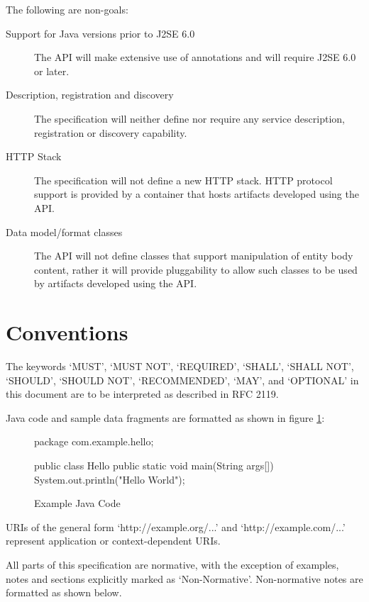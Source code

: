 The following are non-goals:

\begin{description}

\item[Support for Java versions prior to J2SE 6.0] The API will make extensive use of annotations and will require J2SE 6.0 or later.

\item[Description, registration and discovery] The specification will neither define nor require any service description, registration or discovery capability.

\item[HTTP Stack] The specification will not define a new HTTP stack. HTTP protocol support is provided by a container that hosts artifacts developed using the API.

\item[Data model/format classes] The API will not define classes that support manipulation of entity body content, rather it will provide pluggability to allow such classes to be used by artifacts developed using the API.

\end{description}

\section{Conventions}

The keywords `MUST', `MUST NOT', `REQUIRED', `SHALL', `SHALL NOT', `SHOULD', `SHOULD NOT', `RECOMMENDED', `MAY', and `OPTIONAL' in this document are to be interpreted as described in RFC 2119\cite{rfc2119}. 

Java code and sample data fragments are formatted as shown in figure \ref{ex1}:

\begin{figure}[hbtp]
\caption{Example Java Code}
\label{ex1}
\begin{listing}{1}
package com.example.hello;

public class Hello {
    public static void main(String args[]) {
        System.out.println("Hello World");
    }
}\end{listing}
\end{figure}

URIs of the general form `http://example.org/...' and `http://example.com/...' represent application or context-dependent URIs.

All parts of this specification are normative, with the exception of examples, notes and sections explicitly marked as `Non-Normative'. Non-normative notes are formatted as shown below.

